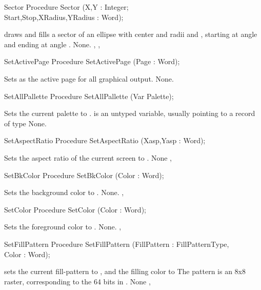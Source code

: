 \begin{procedure}{Sector}
\Declaration
Procedure Sector (X,Y : Integer; \\ Start,Stop,XRadius,YRadius : Word);

\Description
{}
draws and fills a sector of an ellipse  with center  and radii 
 and , starting at angle  and ending at angle .
\Errors
None.
\SeeAlso
{}, , 
\end{procedure}

\begin{procedure}{SetActivePage}
\Declaration
Procedure SetActivePage (Page : Word);

\Description
Sets  as the active page 
for all graphical output.
\Errors
None.
\SeeAlso

\end{procedure}

\begin{procedure}{SetAllPallette}
\Declaration
Procedure SetAllPallette (Var Palette);

\Description
Sets the current palette to
.  is an untyped variable, usually pointing to a
record of type 
\Errors
None.
\SeeAlso
{}
\end{procedure}

\begin{procedure}{SetAspectRatio}
\Declaration
Procedure SetAspectRatio (Xasp,Yasp : Word);

\Description
Sets the aspect ratio of the
current screen to .
\Errors
None
\SeeAlso
{}, 
\end{procedure}

\begin{procedure}{SetBkColor}
\Declaration
Procedure SetBkColor (Color : Word);

\Description
Sets the background color to
.
\Errors
None.
\SeeAlso
{}, 
\end{procedure}

\begin{procedure}{SetColor}
\Declaration
Procedure SetColor (Color : Word);

\Description
Sets the foreground color to
.
\Errors
None.
\SeeAlso
{}, 
\end{procedure}

\begin{procedure}{SetFillPattern}
\Declaration
Procedure SetFillPattern (FillPattern : FillPatternType,\\ Color : Word);

\Description
{} sets the current fill-pattern to , and
the filling color to 
The pattern is an 8x8 raster, corresponding to the 64 bits in
.
\Errors
None
\SeeAlso
{}, 
\end{procedure}

